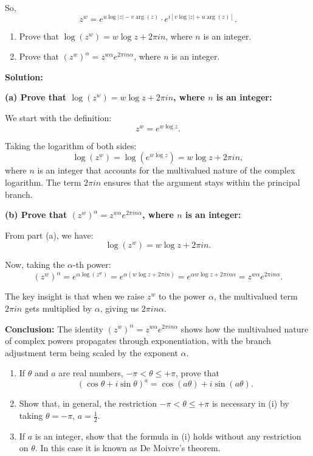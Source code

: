 So,
\[
z^w = e^{u \log |z| - v \arg(z)} \cdot e^{i[v \log |z| + u \arg(z)]}.
\]


\begin{problembox}
\begin{enumerate}[label=\alph*)]
\item Prove that \( \log(z^w) = w \log z + 2\pi i n \), where \( n \) is an integer.
\item Prove that \( (z^w)^\alpha = z^{w\alpha} e^{2\pi i n \alpha} \), where \( n \) is an integer.
\end{enumerate}
\end{problembox}

\textbf{Solution:}

\textbf{(a) Prove that \( \log(z^w) = w \log z + 2\pi i n \), where \( n \) is an integer:}

We start with the definition:
\[
z^w = e^{w \log z}.
\]

Taking the logarithm of both sides:
\[
\log(z^w) = \log(e^{w \log z}) = w \log z + 2\pi i n,
\]
where \( n \) is an integer that accounts for the multivalued nature of the complex logarithm. The term \( 2\pi i n \) ensures that the argument stays within the principal branch.

\textbf{(b) Prove that \( (z^w)^\alpha = z^{w\alpha} e^{2\pi i n \alpha} \), where \( n \) is an integer:}

From part (a), we have:
\[
\log(z^w) = w \log z + 2\pi i n.
\]

Now, taking the \(\alpha\)-th power:
\[
(z^w)^\alpha = e^{\alpha \log(z^w)} = e^{\alpha(w \log z + 2\pi i n)} = e^{\alpha w \log z + 2\pi i n \alpha} = z^{w\alpha} e^{2\pi i n \alpha}.
\]

The key insight is that when we raise \( z^w \) to the power \(\alpha\), the multivalued term \( 2\pi i n \) gets multiplied by \(\alpha\), giving us \( 2\pi i n \alpha \).

\textbf{Conclusion:}
The identity \( (z^w)^\alpha = z^{w\alpha} e^{2\pi i n \alpha} \) shows how the multivalued nature of complex powers propagates through exponentiation, with the branch adjustment term being scaled by the exponent \(\alpha\).
\begin{problembox}
\begin{enumerate}[label=\roman*)]
\item If \( \theta \) and \( a \) are real numbers, \( -\pi < \theta \leq +\pi \), prove that
\[
(\cos \theta + i \sin \theta)^a = \cos(a\theta) + i \sin(a\theta).
\]

\item Show that, in general, the restriction \( -\pi < \theta \leq +\pi \) is necessary in (i) by taking \( \theta = -\pi \), \( a = \tfrac{1}{2} \).

\item If \( a \) is an integer, show that the formula in (i) holds without any restriction on \( \theta \). In this case it is known as De Moivre’s theorem.
\end{enumerate}
\end{problembox}

